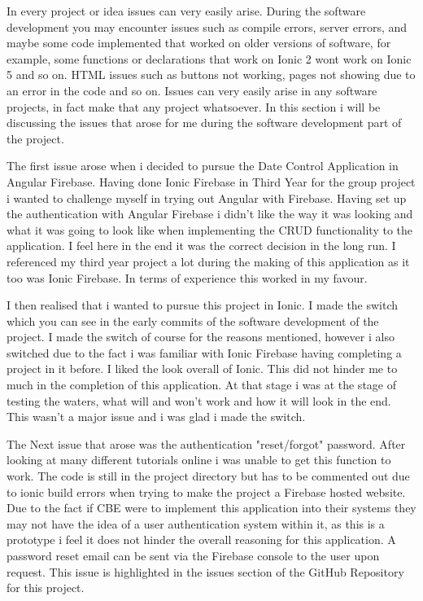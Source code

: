 In every project or idea issues can very easily arise. During the software development you may encounter issues such as compile errors, server errors, and maybe some code implemented that worked on older versions of software, for example, some functions or declarations that work on Ionic 2 wont work on Ionic 5 and so on. HTML issues such as buttons not working, pages not showing due to an error in the code and so on. Issues can very easily arise in any software projects, in fact make that any project whatsoever. In this section i will be discussing the issues that arose for me during the software development part of the project. 
\newline

The first issue arose when i decided to pursue the Date Control Application in Angular Firebase. Having done Ionic Firebase in Third Year for the group project i wanted to challenge myself in trying out Angular with Firebase. Having set up the authentication with Angular Firebase i didn't like the way it was looking and what it was going to look like when implementing the CRUD functionality to the application. I feel here in the end it was the correct decision in the long run. I referenced my third year project a lot during the making of this application as it too was Ionic Firebase. In terms of experience this worked in my favour. 
\newline

I then realised that i wanted to pursue this project in Ionic. I made the switch which you can see in the early commits of the software development of the project. I made the switch of course for the reasons mentioned, however i also switched due to the fact i was familiar with Ionic Firebase having completing a project in it before. I liked the look overall of Ionic. This did not hinder me to much in the completion of this application. At that stage i was at the stage of testing the waters, what will and won't work and how it will look in the end. This wasn't a major issue and i was glad i made the switch. 
\newline

The Next issue that arose was the authentication "reset/forgot" password. After looking at many different tutorials online i was unable to get this function to work. The code is still in the project directory but has to be commented out due to ionic build errors when trying to make the project a Firebase hosted website. Due to the fact if CBE were to implement this application into their systems they may not have the idea of a user authentication system within it, as this is a prototype i feel it does not hinder the overall reasoning for this application. A password reset email can be sent via the Firebase console to the user upon request. This issue is highlighted in the issues section of the GitHub Repository for this project.
\newline

